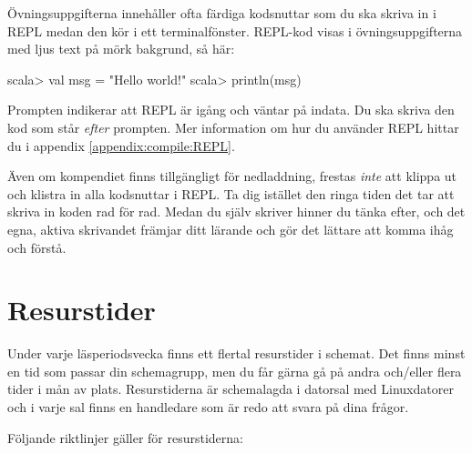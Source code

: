 Övningsuppgifterna innehåller ofta färdiga kodsnuttar som du ska skriva in i REPL medan den kör i ett terminalfönster. REPL-kod visas i övningsuppgifterna med ljus text på mörk bakgrund, så här:
\begin{REPL}
scala> val msg = "Hello world!"
scala> println(msg)
\end{REPL}
Prompten  indikerar att REPL är igång och väntar på indata. Du ska skriva den kod som står \emph{efter} prompten. Mer information om hur du använder REPL hittar du i appendix \ref{appendix:compile:REPL}.

Även om kompendiet finns tillgängligt för nedladdning, frestas \emph{inte} att klippa ut och klistra in alla kodsnuttar i REPL. Ta dig istället den ringa tiden det tar att skriva in koden rad för rad. Medan du själv skriver hinner du tänka efter, och det egna, aktiva skrivandet främjar ditt lärande och gör det lättare att komma ihåg och förstå.


\section{Resurstider}\label{section:tutorials}

Under varje läsperiodsvecka finns ett flertal resurstider i schemat. Det finns minst en tid som passar din schemagrupp, men du får gärna gå på andra och/eller flera tider i mån av plats. Resurstiderna är schemalagda i datorsal med Linuxdatorer och i varje sal finns en handledare som är redo att svara på dina frågor.

Följande riktlinjer gäller för resurstiderna:


